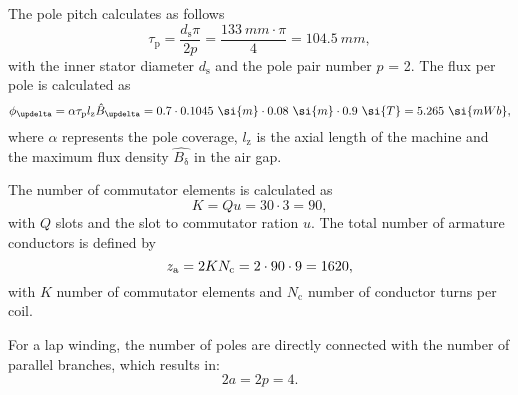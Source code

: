 
\begin{solutionblock}
    The pole pitch calculates as follows
    \begin{equation}
        \tau_{\mathrm{p}} = \frac{d_{\mathrm{s}} \pi}{2 p}
        = \frac{133 \ \si{mm} \cdot \pi}{4}
        = 104.5 \ \si{mm},
    \end{equation}
    with the inner stator diameter $d_{\mathrm{s}}$ and the pole pair number $p$ = 2.
    The flux per pole is calculated as
    \begin{equation}
        \phiDelta = \alpha \tau_{\mathrm{p}} \lz \hat{B}_{\updelta}
        = 0.7 \cdot 0.1045 \ \si{m} \cdot 0.08 \ \si{m} \cdot 0.9 \ \si{T}
        = 5.265 \ \si{mWb},
    \end{equation}
    where $\alpha$ represents the pole coverage, $l_{\mathrm{z}}$ is the axial length of the machine and the maximum flux density $\hat{B_{\updelta}}$ in the air gap.

\end{solutionblock}



\begin{solutionblock}
    The number of commutator elements is calculated as
    \begin{equation}
        K = Q u
        = 30 \cdot 3
        = 90,
    \end{equation}
    with $Q$ slots and the slot to commutator ration $u$. 
    The total number of armature conductors is defined by
    \begin{equation}
        z_{\mathrm{a}} = 2 K N_{\mathrm{c}}
        = 2 \cdot 90 \cdot 9
        = 1620,
    \end{equation}
    with $K$ number of commutator elements and $N_{\mathrm{c}}$ number of conductor turns per coil.

    For a lap winding, the number of poles are directly connected with the number of parallel branches, which results in:
    \begin{equation}
        2a = 2p = 4.
    \end{equation}
\end{solutionblock}



